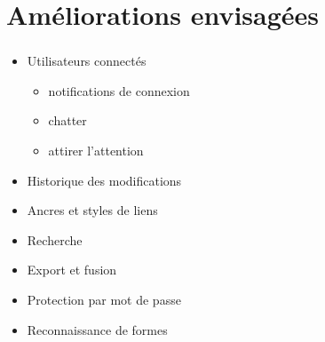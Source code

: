 \documentclass[11pt]{beamer}
\begin{document}
\section{Améliorations envisagées}
\begin{frame}
	\frametitle{\currentname}
  \begin{itemize}
    \item Utilisateurs connectés
      \begin{itemize}
        \item notifications de connexion
        \item chatter
        \item attirer l'attention
      \end{itemize}
    \item Historique des modifications
    \item Ancres et styles de liens
    \item Recherche
    \item Export et fusion
    \item Protection par mot de passe
    \item Reconnaissance de formes
  \end{itemize}
\end{frame}
\end{document}
